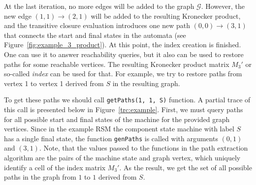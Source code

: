 At the last iteration, no more edges will be added to the graph $\mathcal{G}$. However, the new edge $(1, 1) \rightarrow (2,1)$ will be added to the resulting Kronecker product, and the transitive closure
evaluation introduces one new path $(0, 0) \rightarrow (3,1)$ that connects the start and final states in the automata (see Figure~\ref{fig:example_3_product}).
At this point, the index creation is finished.
One can use it to answer reachability queries, but it also can be used
to restore paths for some reachable vertices. The resulting Kronecker product matrix
$M_3'$ or so-called \textit{index} can be used for that. For example, we try to
restore paths from vertex 1 to vertex 1 derived from $S$ in the resulting graph.

To get these paths we should call \verb|getPaths(1, 1, S)| function.
A partial trace of this call is presented below in Figure~\ref{trc:example}.
First, we must query paths for all possible start and final states of the
machine for the provided graph vertices. Since in the example RSM the component
state machine with label $S$ has a single final state, the function
\verb|genPaths| is called with arguments $(0,1)$ and $(3,1)$.
Note, that the values passed to the functions in the path extraction algorithm are the
pairs of the machine state and graph vertex, which uniquely identify a cell of
the index matrix $M_3'$. As the result,
we get the set of all possible paths in the graph from $1$ to $1$ derived from $S$.

